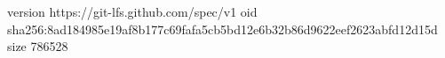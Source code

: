 version https://git-lfs.github.com/spec/v1
oid sha256:8ad184985e19af8b177c69fafa5cb5bd12e6b32b86d9622eef2623abfd12d15d
size 786528
